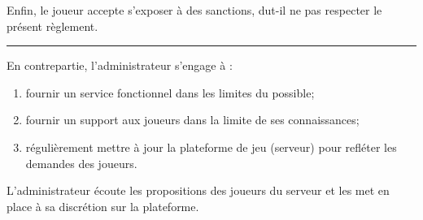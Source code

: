 \begin{flushleft}
\begin{enumerate}
	\end{enumerate}
	Enfin, le joueur accepte s'exposer \`a des sanctions, dut-il ne pas respecter le pr\'esent r\`eglement.
	\noindent\rule{\textwidth}{1pt}
	En contrepartie, l'administrateur s'engage \`a :
	\begin{enumerate}
		\item fournir un service fonctionnel dans les limites du possible;
		\item fournir un support aux joueurs dans la limite de ses connaissances;
		\item r\'eguli\`erement mettre \`a jour la plateforme de jeu (serveur) pour refl\'eter les demandes des joueurs.
	\end{enumerate}
	L'administrateur \'ecoute les propositions des joueurs du serveur et les met en place \`a sa discr\'etion sur la plateforme.
\end{flushleft}
